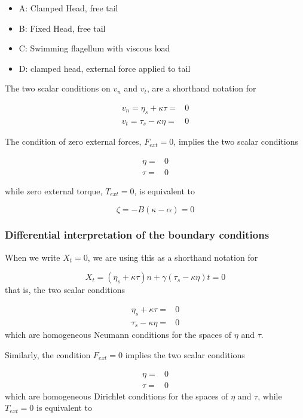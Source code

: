 \begin{itemize}
\item A: Clamped Head, free tail
\item B: Fixed Head, free tail
\item C: Swimming flagellum with viscous load 
\item D: clamped head, external force applied to tail
\end{itemize}

The two scalar conditions on $v_n$ and $v_t$, are a shorthand notation for

$$
\begin{aligned}
v_n = \eta_s + \kappa \tau = & 0 \\
v_t = \tau_s - \kappa \eta = & 0
\end{aligned}
$$

The condition of zero external forces, $F_{ext} = 0$, implies the two scalar conditions

$$
\begin{aligned}
\eta = &0 \\
\tau = &0
\end{aligned}
$$

while zero external torque, $T_{ext} = 0$, is equivalent to 

$$
\zeta = -B(\kappa-\alpha) = 0
$$

\subsubsection{Differential interpretation of the boundary
conditions}\label{differential-interpretation-of-the-boundary-conditions}

When we write \(X_t = 0\), we are using this as a shorthand notation for

\[X_t =  (\eta_s + \kappa \tau) n + \gamma(\tau_s - \kappa \eta) t = 0\]
%
that is, the two scalar conditions

\[\begin{aligned}
\eta_s + \kappa \tau = &0 \\
\tau_s - \kappa \eta = &0
\end{aligned}\]
%
which are homogeneous Neumann conditions for the spaces of $\eta$ and $\tau$.

Similarly, the condition \(F_{ext} = 0\) implies the two scalar
conditions

\[\begin{aligned}
\eta = &0 \\
\tau = &0
\end{aligned}\]
%
which are homogeneous Dirichlet conditions for the spaces of $\eta$
and $\tau$, while \(T_{ext} = 0\) is equivalent to

